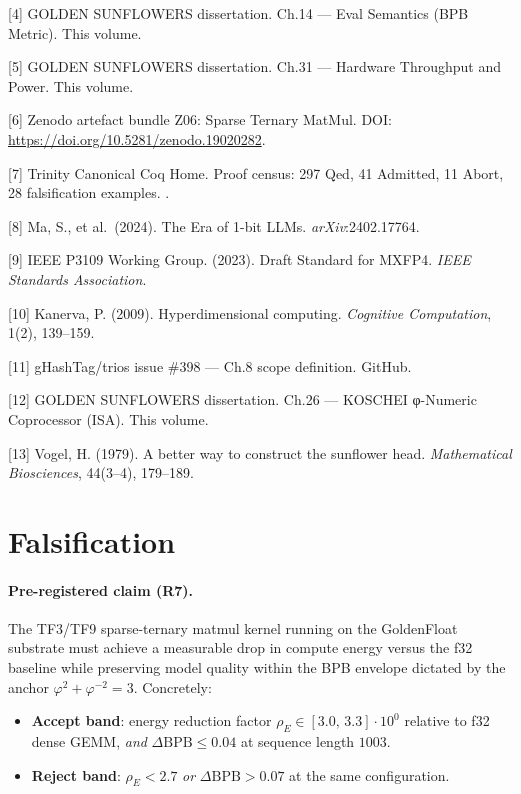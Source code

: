 [4] GOLDEN SUNFLOWERS dissertation. Ch.14 ---
Eval Semantics (BPB Metric). This volume.

[5] GOLDEN SUNFLOWERS dissertation. Ch.31 ---
Hardware Throughput and Power. This volume.

[6] Zenodo artefact bundle Z06: Sparse Ternary
MatMul. DOI:
\url{https://doi.org/10.5281/zenodo.19020282}.

[7] Trinity Canonical Coq Home. Proof census:
297 Qed, 41 Admitted, 11 Abort, 28 falsification
examples. .

[8] Ma, S., et al.~(2024). The Era of 1-bit
LLMs. \emph{arXiv}:2402.17764.

[9] IEEE P3109 Working Group. (2023). Draft
Standard for MXFP4. \emph{IEEE Standards
Association}.

[10] Kanerva, P. (2009). Hyperdimensional
computing. \emph{Cognitive Computation}, 1(2),
139--159.

[11] gHashTag/trios issue \#398 --- Ch.8 scope
definition. GitHub.

[12] GOLDEN SUNFLOWERS dissertation. Ch.26 ---
KOSCHEI φ-Numeric Coprocessor (ISA). This volume.

[13] Vogel, H. (1979). A better way to
construct the sunflower head. \emph{Mathematical
Biosciences}, 44(3--4), 179--189.

\section{Falsification}
\label{fa_08:sec:falsification:ch08}

\paragraph{Pre-registered claim (R7).}
The TF3/TF9 sparse-ternary matmul kernel running on the GoldenFloat substrate
must achieve a measurable drop in compute energy versus the f32 baseline while
preserving model quality within the BPB envelope dictated by the anchor
$\varphi^2 + \varphi^{-2} = 3$. Concretely:

\begin{itemize}
    \item \textbf{Accept band}: energy reduction factor
          $\rho_E \in [3.0,\,3.3] \cdot 10^{0}$ relative to f32 dense GEMM,
          \emph{and} $\Delta\mathrm{BPB} \le 0.04$ at sequence length $1003$.
    \item \textbf{Reject band}: $\rho_E < 2.7$ \emph{or}
          $\Delta\mathrm{BPB} > 0.07$ at the same configuration.
\end{itemize}

